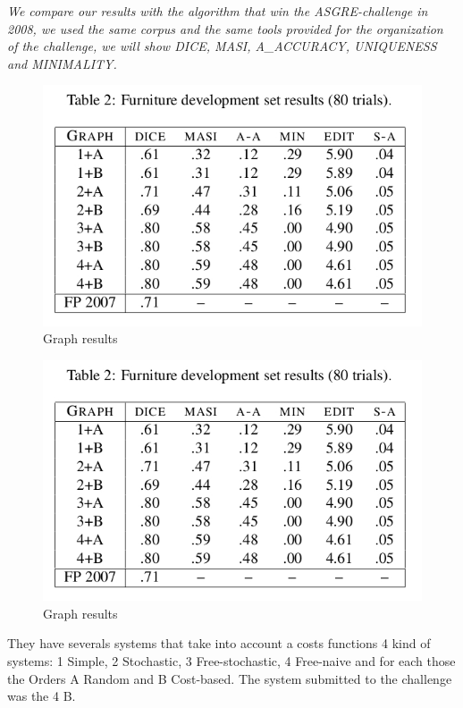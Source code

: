 \textit{We compare our results with the algorithm that win the ASGRE-challenge in 2008, we used the same corpus and the same tools provided for the organization of the challenge, we will show DICE, MASI, A\_ACCURACY, UNIQUENESS and MINIMALITY. \cite{graph08}}

\begin{figure}[h!]
\begin{center}
\includegraphics[width=.7\textwidth]{images/graphResults.jpg}
\end{center}
\vspace*{-2em}
\caption{Graph results \label{graphResults}}
\end{figure}

\begin{figure}[h!]
\begin{center}
\includegraphics[width=.7\textwidth]{images/graphResults.jpg}
\end{center}
\vspace*{-2em}
\caption{Graph results \label{graphResults2}}
\end{figure}

They have severals systems that take into account a costs functions 4 kind of systems: 1 Simple, 2 Stochastic, 3 Free-stochastic, 4 Free-naive and for each those the Orders A Random and B Cost-based. The system submitted to the challenge was the 4 B.\\

